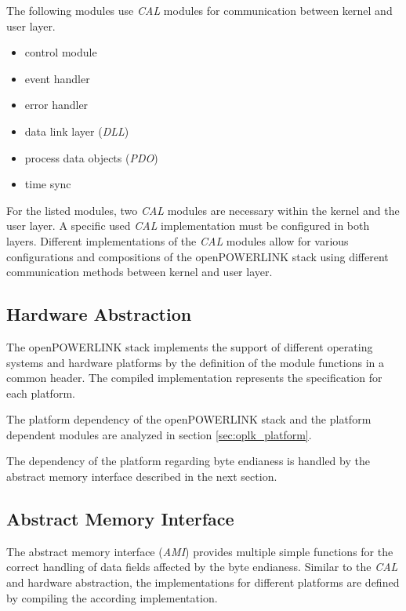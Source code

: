 The following modules use \emph{CAL} modules for communication between kernel and user layer. 

\begin{itemize}
    \item control module
    \item event handler
    \item error handler
    \item data link layer (\emph{DLL})
    \item process data objects (\emph{PDO})
    \item time sync
\end{itemize}

For the listed modules, two \emph{CAL} modules are necessary within the kernel and the user layer.
A specific used \emph{CAL} implementation must be configured in both layers.
Different implementations of the \emph{CAL} modules allow for various configurations and compositions of the openPOWERLINK stack using different communication methods between kernel and user layer. \cite[CAL]{openpowerlink_doc}

\subsection{Hardware Abstraction}
\label{sec:oplk_architecture_hardware}
The openPOWERLINK stack implements the support of different operating systems and hardware platforms by the definition of the module functions in a common header.
The compiled implementation represents the specification for each platform.

The platform dependency of the openPOWERLINK stack and the platform dependent modules are analyzed in section \ref{sec:oplk_platform}.

The dependency of the platform regarding byte endianess is handled by the abstract memory interface described in the next section.

\subsection{Abstract Memory Interface}
\label{sec:oplk_architecture_ami}

The abstract memory interface (\emph{AMI}) provides multiple simple functions for the correct handling of data fields affected by the byte endianess.
Similar to the \emph{CAL} and hardware abstraction, the implementations for different platforms are defined by compiling the according implementation. \cite[AMI]{openpowerlink_doc}
\\

